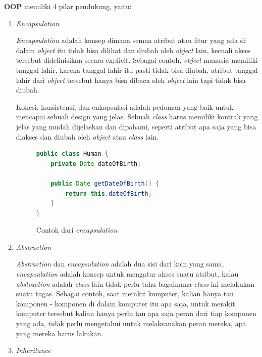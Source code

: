 \documentclass[a4paper]{article}
\begin{document}
\textbf{OOP} memiliki 4 pilar pendukung, yaitu:
\begin{enumerate}

    \item \textit{Encapsulation}

          \textit{Encapsulation} adalah konsep dimana semua atribut atau fitur yang ada di dalam \textit{object} itu tidak bisa dilihat dan diubah oleh \textit{object} lain, kecuali akses tersebut didefinisikan secara explicit\autocite{education-erin-oop-2020}. Sebagai contoh, \textit{object} manusia memiliki tanggal lahir, karena tanggal lahir itu pasti tidak bisa diubah, atribut tanggal lahir dari \textit{object} tersebut hanya bisa dibaca oleh \textit{object} lain tapi tidak bisa diubah.

          Kohesi, konsistensi, dan enkapsulasi adalah pedoman yang baik untuk mencapai sebuah design yang jelas. Sebuah \textit{class} harus memiliki kontrak yang jelas yang mudah dijelaskan dan dipahami, seperti atribut apa saja yang bisa diakses dan diubah oleh \textit{object} atau \textit{class} lain\autocite{liang_liang_2021}.

          \begin{figure}[h]
              \centering
              \begin{lstlisting}[language=Java]
public class Human {
    private Date dateOfBirth;

    public Date getDateOfBirth() {
        return this.dateOfBirth;
    }
}\end{lstlisting}
              \caption{Contoh dari \textit{encapsulation}}
          \end{figure}
          \newpage

    \item \textit{Abstraction}

          \textit{Abstraction} dan \textit{encapsulation} adalah dua sisi dari koin yang sama, \textit{encapsulation} adalah konsep untuk mengatur akses suatu atribut, kalau \textit{abstraction} adalah \textit{class} lain tidak perlu tahu bagaimana \textit{class} ini melakukan suatu tugas\autocite{liang_liang_2021}. Sebagai contoh, saat merakit komputer, kalian hanya tau komponen - komponen di dalam komputer itu apa saja, untuk merakit komputer tersebut kalian hanya perlu tau apa saja peran dari tiap komponen yang ada, tidak perlu mengetahui untuk melaksanakan peran mereka, apa yang mereka harus lakukan.

    \item \textit{Inheritance}


\end{enumerate}
\end{document}
